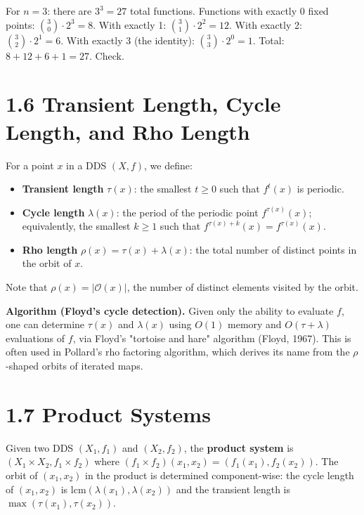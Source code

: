 \begin{example}
For $n = 3$: there are $3^3 = 27$ total functions. Functions with exactly 0 fixed points: $\binom{3}{0} \cdot 2^3 = 8$. With exactly 1: $\binom{3}{1} \cdot 2^2 = 12$. With exactly 2: $\binom{3}{2} \cdot 2^1 = 6$. With exactly 3 (the identity): $\binom{3}{3} \cdot 2^0 = 1$. Total: $8 + 12 + 6 + 1 = 27$. Check.
\end{example}

\section{1.6 Transient Length, Cycle Length, and Rho Length}

For a point $x$ in a DDS $(X, f)$, we define:

\begin{itemize}
  \item \textbf{Transient length} $\tau(x)$: the smallest $t \geq 0$ such that $f^t(x)$ is periodic.
  \item \textbf{Cycle length} $\lambda(x)$: the period of the periodic point $f^{\tau(x)}(x)$; equivalently, the smallest $k \geq 1$ such that $f^{\tau(x)+k}(x) = f^{\tau(x)}(x)$.
  \item \textbf{Rho length} $\rho(x) = \tau(x) + \lambda(x)$: the total number of distinct points in the orbit of $x$.
\end{itemize}

Note that $\rho(x) = |\mathcal{O}(x)|$, the number of distinct elements visited by the orbit.

\textbf{Algorithm (Floyd's cycle detection).} Given only the ability to evaluate $f$, one can determine $\tau(x)$ and $\lambda(x)$ using $O(1)$ memory and $O(\tau + \lambda)$ evaluations of $f$, via Floyd's "tortoise and hare" algorithm (Floyd, 1967). This is often used in Pollard's rho factoring algorithm, which derives its name from the $\rho$-shaped orbits of iterated maps.

\section{1.7 Product Systems}

Given two DDS $(X_1, f_1)$ and $(X_2, f_2)$, the \textbf{product system} is $(X_1 \times X_2, f_1 \times f_2)$ where $(f_1 \times f_2)(x_1, x_2) = (f_1(x_1), f_2(x_2))$. The orbit of $(x_1, x_2)$ in the product is determined component-wise: the cycle length of $(x_1, x_2)$ is $\text{lcm}(\lambda(x_1), \lambda(x_2))$ and the transient length is $\max(\tau(x_1), \tau(x_2))$.

